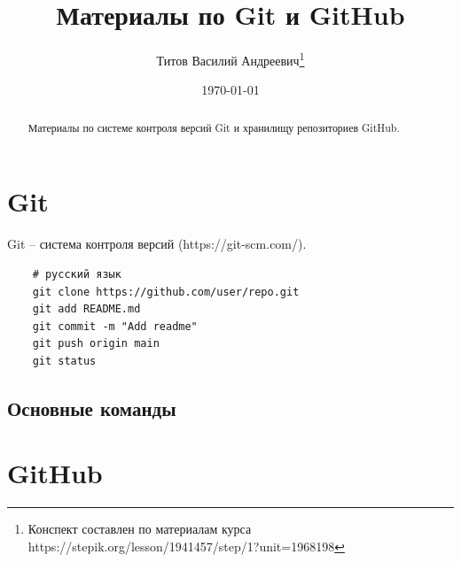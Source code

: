 \documentclass{article}
\title{Материалы по Git и GitHub}
\author{Титов Василий Андреевич\thanks{Конспект составлен по материалам курса https://stepik.org/lesson/1941457/step/1?unit=1968198}}
\date\today
\begin{document}
\maketitle

\tableofcontents

\begin{abstract}
    Материалы по системе контроля версий Git и хранилищу репозиториев GitHub.
\end{abstract}

\section{Git}

Git -- система контроля версий (https://git-scm.com/).

\begin{lstlisting}
    # русский язык
    git clone https://github.com/user/repo.git
    git add README.md
    git commit -m "Add readme"
    git push origin main
    git status
\end{lstlisting}


\subsection{Основные команды}

\section{GitHub}
\end{document}
